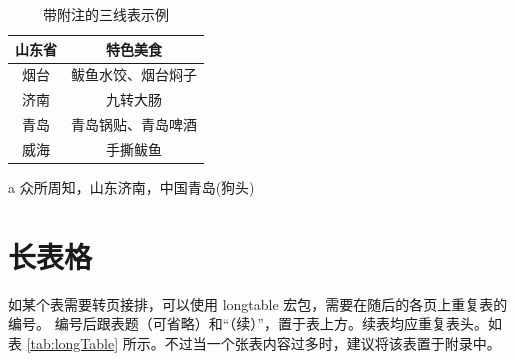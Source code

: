 \documentclass[
    report,     %
    oneside,    %
    UTF8,       %
    zihao=-4    %
]{config} %
\begin{document}
\begin{table}[H]
    \centering
    \caption{带附注的三线表示例}
    \label{tab:three-line-with-note}
    \renewcommand\arraystretch{0.85} %
    \setlength{\tabcolsep}{15pt} %
    \begin{threeparttable}[c]
        \begin{tabular}{cc}
            \toprule[1.5pt]
            \textbf{山东省}  & \textbf{特色美食}\\
            \midrule[0.8pt]
            烟台           & 鲅鱼水饺、烟台焖子\\
            济南\tnote{a}  & 九转大肠\\
            青岛           & 青岛锅贴、青岛啤酒\\
            威海           & 手撕鲅鱼\\
            \bottomrule[1.5pt]
        \end{tabular}
        \begin{tablenotes}
            \item [a] {众所周知，山东济南，中国青岛(狗头)}
        \end{tablenotes}
    \end{threeparttable}
\end{table}
\vspace{-0.9em}  %

\section{长表格}

如某个表需要转页接排，可以使用 longtable 宏包，需要在随后的各页上重复表的编号。
编号后跟表题（可省略）和“（续）”，置于表上方。续表均应重复表头。如表 \ref{tab:longTable} 所示。不过当一个张表内容过多时，建议将该表置于附录中。
\end{document}

